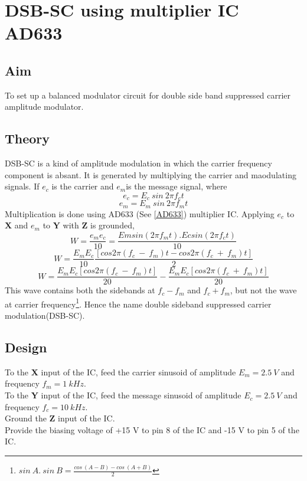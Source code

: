 \chapter[DSB-SC using multiplier IC AD633]{DSB-SC using multiplier IC AD633}
\label{chapdsbsc}
\section*{Aim}
To set up a balanced modulator circuit for double side band suppressed carrier amplitude modulator.
\section*{Theory}
DSB-SC is a kind of amplitude modulation in which the carrier frequency component is absant. It is generated by multiplying the carrier and maodulating signals. If $e_c$ is the carrier and $e_m$is the message signal, where
\begin{equation}
e_c=E_c\  sin\ 2\pi f_ct
\end{equation}
\begin{equation}
e_m=E_m\  sin\ 2\pi f_mt
\end{equation}
Multiplication is done using AD633 (See \ref{AD633}) multiplier IC.
Applying $e_c$ to $\textbf{X}$ and $e_m$ to $\textbf{Y}$ with $\textbf{Z}$ is grounded, 
\begin{equation}
W= \frac{e_me_c}{10} =\frac{Emsin(2\pi f_mt).Ecsin(2\pi f_ct)}{10}
\end{equation}
\begin{equation}
W= \frac{E_mE_c}{10} \frac{[cos 2\pi (f_c\ -\ f_m)t-cos 2\pi (f_c\ +\ f_m)t]}{2}
\end{equation}
\begin{equation}
W= \frac{E_mE_c [cos 2\pi (f_c\ -\ f_m)t]}{20}- \frac{E_mE_c[cos 2\pi (f_c\ +\ f_m)t]}{20}
\end{equation}
This wave contains both the sidebands at $f_c-f_m$ and $f_c+f_m$, but not the wave at carrier frequency\footnote{$sin \ A.\ sin\ B=\frac{cos\ (A-B)-cos\ (A+B)}{2}$}. Hence the name double sideband suppressed carrier modulation(DSB-SC).
\section*{Design}

To the \textbf{X} input of the IC, feed the carrier sinusoid of amplitude $E_m=2.5\ V$ and frequency $f_m= 1\ kHz$.\\

To the \textbf{Y} input of the IC, feed the message sinusoid of amplitude $E_c=2.5\ V$ and frequency $f_c= 10\ kHz$.\\
Ground the \textbf{Z} input of the IC.\\
Provide the biasing voltage of +15 V to pin 8 of the IC and -15 V to pin 5 of the IC.\\

